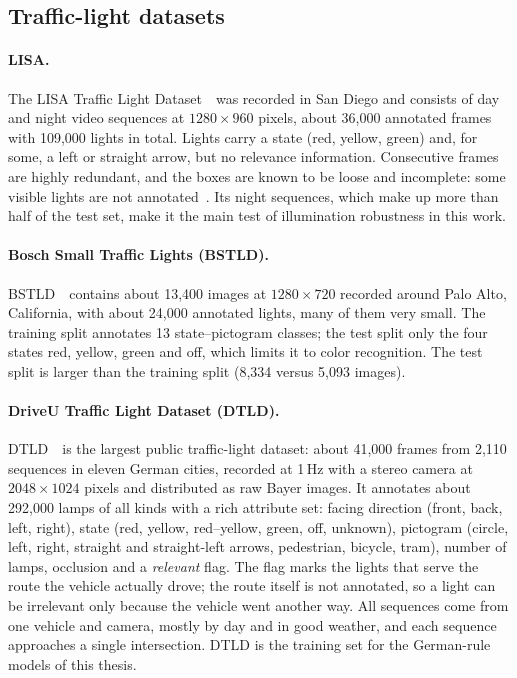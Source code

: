 \subsection{Traffic-light datasets}

\paragraph{LISA.} The LISA Traffic Light Dataset~\cite{jensen2016vision}\, was
recorded in San Diego and consists of day and night video sequences at $1280\times960$ pixels, about
36,000 annotated frames with 109,000 lights in total. Lights carry a state (red, yellow, green) and,
for some, a left or straight arrow, but no relevance information. Consecutive frames are highly
redundant, and the boxes are known to be loose and incomplete: some visible lights are not
annotated~\cite{polley2025atlas,fregin2018dtld}. Its night sequences, which make up more than half of
the test set, make it the main test of illumination robustness in this work.

\paragraph{Bosch Small Traffic Lights (BSTLD).} BSTLD~\cite{behrendt2017deep}\,
contains about 13,400 images at $1280\times720$ recorded around Palo Alto, California, with about
24,000 annotated lights, many of them very small. The training split annotates 13 state--pictogram
classes; the test split only the four states red, yellow, green and off, which limits it to color
recognition. The test split is larger than the training split (8,334 versus 5,093 images).

\paragraph{DriveU Traffic Light Dataset (DTLD).} DTLD~\cite{fregin2018dtld}\, is the
largest public traffic-light dataset: about 41,000 frames from 2,110 sequences in eleven German cities,
recorded at 1\,Hz with a stereo camera at $2048\times1024$ pixels and distributed as raw Bayer
images. It annotates about 292,000 lamps of all kinds with a rich attribute set: facing direction
(front, back, left, right), state (red, yellow, red--yellow, green, off, unknown), pictogram (circle,
left, right, straight and straight-left arrows, pedestrian, bicycle, tram), number of lamps, occlusion
and a \emph{relevant} flag. The flag marks the lights that serve the route the vehicle actually drove;
the route itself is not annotated, so a light can be irrelevant only because the vehicle went another
way. All sequences come from one vehicle and camera, mostly by day and in good weather, and each
sequence approaches a single intersection. DTLD is the training set for the German-rule models of this
thesis.

